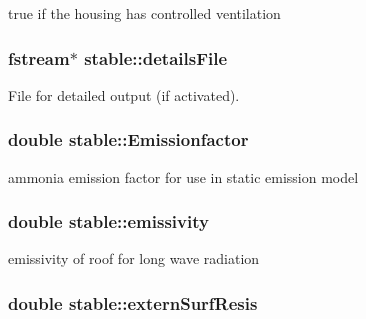 true if the housing has controlled ventilation \hypertarget{classstable_aa1825c229093fbb6ace9325613c4837b}{
\subsubsection[{detailsFile}]{\setlength{\rightskip}{0pt plus 5cm}fstream$\ast$ {\bf stable::detailsFile}}}
\label{classstable_aa1825c229093fbb6ace9325613c4837b}


File for detailed output (if activated). \hypertarget{classstable_a81925f4e6ae3fff76da6011035ae6e93}{
\subsubsection[{Emissionfactor}]{\setlength{\rightskip}{0pt plus 5cm}double {\bf stable::Emissionfactor}}}
\label{classstable_a81925f4e6ae3fff76da6011035ae6e93}


ammonia emission factor for use in static emission model \hypertarget{classstable_a19ded1916302f2b2a616f5aef49b3d56}{
\subsubsection[{emissivity}]{\setlength{\rightskip}{0pt plus 5cm}double {\bf stable::emissivity}}}
\label{classstable_a19ded1916302f2b2a616f5aef49b3d56}


emissivity of roof for long wave radiation \hypertarget{classstable_ae2a0976b43911d11324350d18211b1ed}{
\subsubsection[{externSurfResis}]{\setlength{\rightskip}{0pt plus 5cm}double {\bf stable::externSurfResis}}}
\label{classstable_ae2a0976b43911d11324350d18211b1ed}


